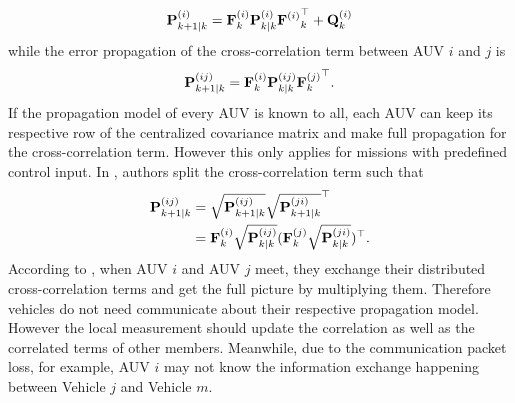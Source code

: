 \begin{equation}
{\bf P}_{k+1|k}^{(i)}={\bf F}^{(i)}_{k}{\bf P}^{(i)}_{k|k}{{\bf F}^{(i)}}_{k}^\top+{\bf Q}^{(i)}_{k}
\end{equation}
while the error propagation of the cross-correlation term between AUV $i$ and $j$ is
\begin{equation}
{\bf P}_{k+1|k}^{(ij)}={\bf F}^{(i)}_{k}{\bf P}_{k|k}^{(ij)}{{\bf F}_{k}^{(j)}}^\top.
\end{equation}
If the propagation model of every AUV is known to all, each AUV can keep its respective row of the centralized covariance matrix and make full propagation for the cross-correlation term. However this only applies for missions with predefined control input. In \cite{Stergios2000}, authors split the cross-correlation term such that
 \begin{align}
\begin{split}
{\bf P}^{(ij)}_{k+1|k}&=\sqrt{{\bf P}^{(ij)}_{k+1|k}}\sqrt{{\bf P}^{(ji)}_{k+1|k}}^\top \\
&={\bf F}^{(i)}_{k}\sqrt{{\bf P}^{(ij)}_{k|k}}({\bf F}^{(j)}_{k}\sqrt{{\bf P}^{(ji)}_{k|k}})^\top.
\end{split}
\end{align}
According to \cite{Stergios2000}, when AUV $i$ and AUV $j$ meet, they exchange their distributed cross-correlation terms and get the full picture by multiplying them. Therefore vehicles do not need communicate about their respective propagation model. However the local measurement should update the correlation as well as the correlated terms of other members. Meanwhile, due to the communication packet loss, for example, AUV $i$ may not know the information exchange happening between Vehicle $j$ and Vehicle $m$.

